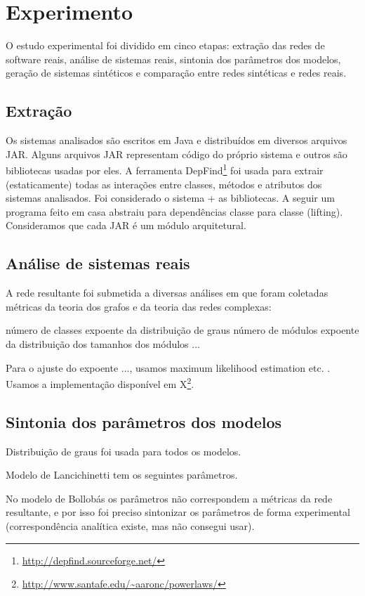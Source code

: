 \documentclass{acm_proc_article-sp}
\begin{document}
\section{Experimento} %

O estudo experimental foi dividido em cinco etapas: extração das redes de software reais, análise de sistemas reais, sintonia dos parâmetros dos modelos, geração de sistemas sintéticos e comparação entre redes sintéticas e redes reais. 

\subsection{Extração}

Os sistemas analisados são escritos em Java e distribuídos em diversos arquivos JAR. Alguns arquivos JAR representam código do próprio sistema e outros são bibliotecas usadas por eles. A ferramenta DepFind\footnote{\url{http://depfind.sourceforge.net/}} foi usada para extrair (estaticamente) todas as interações entre classes, métodos e atributos dos sistemas analisados. Foi considerado o sistema + as bibliotecas. A seguir um programa feito em casa abstraiu para dependências classe para classe (lifting). Consideramos que cada JAR é um módulo arquitetural.

\subsection{Análise de sistemas reais}

A rede resultante foi submetida a diversas análises em que foram coletadas métricas da teoria dos grafos e da teoria das redes complexas:

número de classes
expoente da distribuição de graus
número de módulos
expoente da distribuição dos tamanhos dos módulos
...

Para o ajuste do expoente ..., usamos maximum likelihood estimation etc. \cite{Clauset2007}. Usamos a implementação disponível em X\footnote{\url{http://www.santafe.edu/~aaronc/powerlaws/}}.

\subsection{Sintonia dos parâmetros dos modelos}

Distribuição de graus foi usada para todos os modelos.

Modelo de Lancichinetti tem os seguintes parâmetros.

No modelo de Bollobás os parâmetros não correspondem a métricas da rede resultante, e por isso foi preciso sintonizar os parâmetros de forma experimental (correspondência analítica existe, mas não consegui usar).
\end{document}
